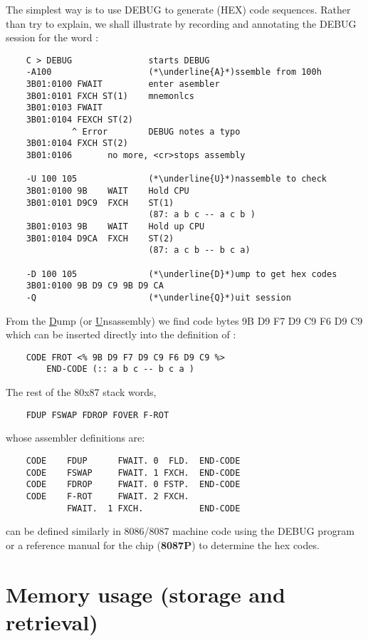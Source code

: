 The simplest way is to use DEBUG to generate (HEX) code sequences. Rather than try to explain, we shall illustrate by recording and annotating the DEBUG session for the word :

\begin{lstlisting}
    C > DEBUG               starts DEBUG
    -A100                   (*\underline{A}*)ssemble from 100h
    3B01:0100 FWAIT         enter asembler
    3B01:0101 FXCH ST(1)    mnemonlcs
    3B01:0103 FWAIT
    3B01:0104 FEXCH ST(2)
             ^ Error        DEBUG notes a typo
    3B01:0104 FXCH ST(2)
    3B01:0106       no more, <cr>stops assembly
    
    -U 100 105              (*\underline{U}*)nassemble to check
    3B01:0100 9B    WAIT    Hold CPU
    3B01:0101 D9C9  FXCH    ST(1)
                            (87: a b c -- a c b )
    3B01:0103 9B    WAIT    Hold up CPU
    3B01:0104 D9CA  FXCH    ST(2)
                            (87: a c b -- b c a)

    -D 100 105              (*\underline{D}*)ump to get hex codes
    3B01:0100 9B D9 C9 9B D9 CA
    -Q                      (*\underline{Q}*)uit session
\end{lstlisting}

From the \underline{D}ump (or \underline{U}nsassembly) we find code bytes 9B D9 F7 D9 C9 F6 D9 C9 which can be inserted directly into the definition of :

\begin{lstlisting}
    CODE FROT <% 9B D9 F7 D9 C9 F6 D9 C9 %>
        END-CODE (:: a b c -- b c a )
\end{lstlisting}
The rest of the 80x87 stack words,
\begin{lstlisting}
    FDUP FSWAP FDROP FOVER F-ROT
\end{lstlisting}

whose assembler definitions are:
\begin{lstlisting}
    CODE    FDUP      FWAIT. 0  FLD.  END-CODE
    CODE    FSWAP     FWAIT. 1 FXCH.  END-CODE
    CODE    FDROP     FWAIT. 0 FSTP.  END-CODE
    CODE    F-ROT     FWAIT. 2 FXCH.
            FWAIT.  1 FXCH.           END-CODE
\end{lstlisting}

can be defined similarly in 8086/8087 machine code using the
DEBUG program or a reference manual for the chip (\eg\space\textbf{8087P}) to determine the hex codes.

\section{Memory usage (storage and retrieval)}

